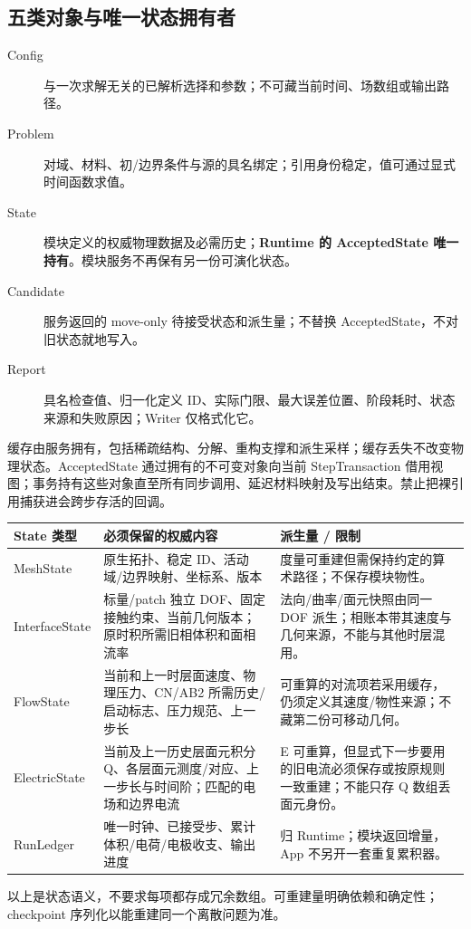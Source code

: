 \documentclass[UTF8,a4paper,11pt,fontset=fandol]{ctexart}
\numberwithin{equation}{section}
\begin{document}
\subsection{五类对象与唯一状态拥有者}
\begin{description}
\item[Config] 与一次求解无关的已解析选择和参数；不可藏当前时间、场数组或输出路径。
\item[Problem] 对域、材料、初/边界条件与源的具名绑定；引用身份稳定，值可通过显式时间函数求值。
\item[State] 模块定义的权威物理数据及必需历史；\textbf{Runtime 的 AcceptedState 唯一持有}。模块服务不再保有另一份可演化状态。
\item[Candidate] 服务返回的 move-only 待接受状态和派生量；不替换 AcceptedState，不对旧状态就地写入。
\item[Report] 具名检查值、归一化定义 ID、实际门限、最大误差位置、阶段耗时、状态来源和失败原因；Writer 仅格式化它。
\end{description}
缓存由服务拥有，包括稀疏结构、分解、重构支撑和派生采样；缓存丢失不改变物理状态。AcceptedState 通过拥有的不可变对象向当前 StepTransaction 借用视图；事务持有这些对象直至所有同步调用、延迟材料映射及写出结束。禁止把裸引用捕获进会跨步存活的回调。

\begin{longtable}{@{}P{.23\textwidth}P{.44\textwidth}P{.27\textwidth}@{}}
\toprule State 类型 & 必须保留的权威内容 & 派生量 / 限制\\\midrule\endhead
MeshState & 原生拓扑、稳定 ID、活动域/边界映射、坐标系、版本 & 度量可重建但需保持约定的算术路径；不保存模块物性。\\
InterfaceState & 标量/patch 独立 DOF、固定接触约束、当前几何版本；原时积所需旧相体积和面相流率 & 法向/曲率/面元快照由同一 DOF 派生；相账本带其速度与几何来源，不能与其他时层混用。\\
FlowState & 当前和上一时层面速度、物理压力、CN/AB2 所需历史/启动标志、压力规范、上一步长 & 可重算的对流项若采用缓存，仍须定义其速度/物性来源；不藏第二份可移动几何。\\
ElectricState & 当前及上一历史层面元积分 Q、各层面元测度/对应、上一步长与时间阶；匹配的电场和边界电流 & E 可重算，但显式下一步要用的旧电流必须保存或按原规则一致重建；不能只存 Q 数组丢面元身份。\\
RunLedger & 唯一时钟、已接受步、累计体积/电荷/电极收支、输出进度 & 归 Runtime；模块返回增量，App 不另开一套重复累积器。\\
\bottomrule
\end{longtable}
以上是状态语义，不要求每项都存成冗余数组。可重建量明确依赖和确定性；checkpoint 序列化以能重建同一个离散问题为准。
\end{document}
